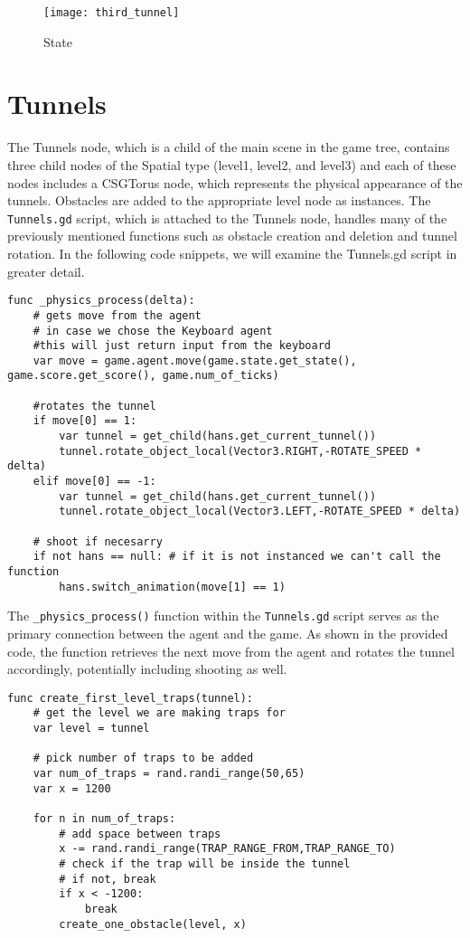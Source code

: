 \begin{figure}[h]
    \centering
    \texttt{[image: third\_tunnel]}
    \caption{State}
    \label{fig:third_tunnel}
\end{figure}

\section{Tunnels}
\label{tunnel_script}
The Tunnels node, which is a child of the main scene in the game tree, contains three child nodes of the Spatial type (level1, level2, and level3) and each of these nodes includes a CSGTorus node, which represents the physical appearance of the tunnels. Obstacles are added to the appropriate level node as instances. The \texttt{Tunnels.gd} script, which is attached to the Tunnels node, handles many of the previously mentioned functions such as obstacle creation and deletion and tunnel rotation. In the following code snippets, we will examine the Tunnels.gd script in greater detail.

\begin{lstlisting}
func _physics_process(delta):   
	# gets move from the agent
	# in case we chose the Keyboard agent 
	#this will just return input from the keyboard
    var move = game.agent.move(game.state.get_state(), game.score.get_score(), game.num_of_ticks)
    
    #rotates the tunnel
    if move[0] == 1:
        var tunnel = get_child(hans.get_current_tunnel())
        tunnel.rotate_object_local(Vector3.RIGHT,-ROTATE_SPEED * delta)
    elif move[0] == -1:
        var tunnel = get_child(hans.get_current_tunnel())
        tunnel.rotate_object_local(Vector3.LEFT,-ROTATE_SPEED * delta)
        
    # shoot if necesarry
    if not hans == null: # if it is not instanced we can't call the function       
        hans.switch_animation(move[1] == 1)
\end{lstlisting}

The \texttt{\_physics\_process()} function within the \texttt{Tunnels.gd} script serves as the primary connection between the agent and the game. As shown in the provided code, the function retrieves the next move from the agent and rotates the tunnel accordingly, potentially including shooting as well.

\begin{lstlisting} 
func create_first_level_traps(tunnel):
    # get the level we are making traps for
    var level = tunnel
    
    # pick number of traps to be added
    var num_of_traps = rand.randi_range(50,65)
    var x = 1200
    
    for n in num_of_traps:
        # add space between traps
        x -= rand.randi_range(TRAP_RANGE_FROM,TRAP_RANGE_TO)
        # check if the trap will be inside the tunnel
        # if not, break
        if x < -1200:
            break
        create_one_obstacle(level, x) 
\end{lstlisting}

